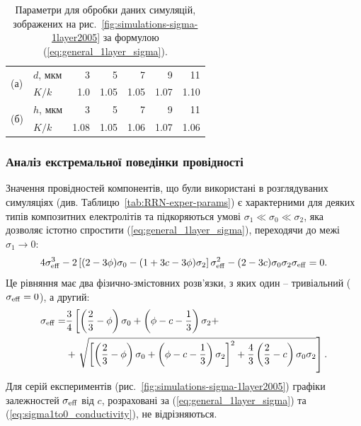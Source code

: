 \documentclass[14pt,twoside]{vakthesis}
\begin{document}
\begin{table}[t]
	\centering
	\caption{Параметри для обробки даних симуляцій, зображених на рис.~\ref{fig:simulations-sigma-1layer2005} за формулою (\ref{eq:general_1layer_sigma}).}
	\label{tab:numerical-homogeneous}
	\begin{tabular}{|l|l|r|r|r|r|r|}
		\hline
		\multirow{2}{*}{(а)} & $d$, мкм & 3 & 5 & 7 & 9 & 11 \\ \cline{2-7} 
		& $K/k$ & 1.0 & 1.05 & 1.05 & 1.07 & 1.10 \\ \hline
		\multirow{2}{*}{(б)} & $h$, мкм & 3 & 5 & 7 & 9 & 11 \\ \cline{2-7} 
		& $K/k$ & 1.08 & 1.05 & 1.06 & 1.07 & 1.06 \\ \hline
	\end{tabular}
\end{table}


\subsubsection{Аналіз екстремальної поведінки провідності}%

Значення провідностей компонентів, що були використані в розглядуваних симуляціях (див. Таблицю~\ref{tab:RRN-exper-params}) є характерними для деяких типів композитних електролітів та підкоряються умові $\sigma_1 \ll \sigma_0 \ll \sigma_2$, яка дозволяє істотно спростити (\ref{eq:general_1layer_sigma}), переходячи до межі $\sigma_1 \to 0$:
\begin{equation}\label{eq:sigma1to0}
4\sigma_{\rm eff}^3  -2 \left[(2-3
\phi)\sigma_0-(1+3c-3\phi)\sigma_2\right] \sigma_{\rm eff}^2
-(2-3c) \sigma_0\sigma_2\sigma_{\rm eff}=0.
\end{equation}
Це рівняння має два фізично-змістовних розв'язки, з яких один -- тривіальний ($\sigma_{\rm eff} = 0$), а другий:
\begin{equation}\label{eq:sigma1to0_conductivity}
\begin{split}
\sigma_{\rm eff} =& \frac{3}{4} \left[ \left( \frac{2}{3} - \phi \right) \sigma_0 +
\left( \phi - c - \frac{1}{3} \right) \sigma_2 + \right. \\
&+ \left. \sqrt{\left[  \left( \frac{2}{3} - \phi \right) \sigma_0 +
	\left( \phi - c - \frac{1}{3} \right) \sigma_2 \right]^2 + \frac{4}{3} \left( \frac{2}{3} - c \right) \sigma_0\sigma_2} \right].
\end{split}
\end{equation}
Для серій експериментів \cite{Siekierski2005} (рис.~\ref{fig:simulations-sigma-1layer2005}) графіки залежностей $\sigma_{\rm eff}$ від $c$, розраховані за (\ref{eq:general_1layer_sigma}) та (\ref{eq:sigma1to0_conductivity}), не відрізняються.
\end{document}
